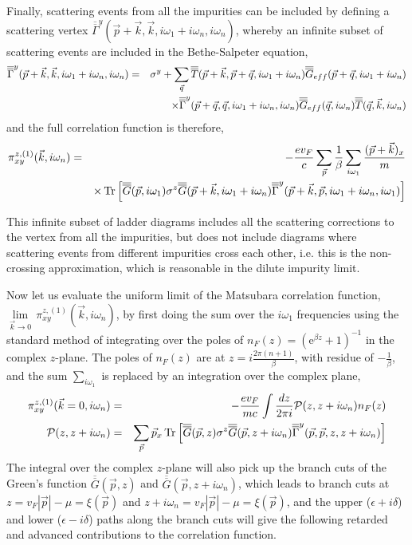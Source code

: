 \documentclass[letter,12pt,preprint,aps]{revtex4-1}
\newcommand{\ba}{\begin{eqnarray}}
\newcommand{\ea}{\end{eqnarray}}
\newcommand{\me}{\mathrm{e}}
\newcommand{\Gbar}{\overline{\overline{G}}}
\newcommand{\Tbar}{\overline{\overline{T}}}
\newcommand{\Gammabar}{\overline{\overline{\Gamma}}}
\begin{document}
Finally, scattering events from all the impurities can be included by defining a scattering vertex $\Gammabar^{y}(\vec{p} + \vec{k}, \vec{k}, i \omega_1 + i \omega_n, i \omega_n)$, whereby an infinite subset of scattering events are included in the Bethe-Salpeter equation,
%
\ba
\label{eqn: vertex Dyson eqn}
\Gammabar^{y}(\vec{p} + \vec{k}, \vec{k}, i \omega_1 + i \omega_n, i \omega_n) & = & \sigma^y + \sum_{\vec{q}} \Tbar(\vec{p} + \vec{k}, \vec{p} + \vec{q}, i \omega_1 + i \omega_n) \Gbar_{eff}(\vec{p}+\vec{q}, i \omega_1 + i \omega_n) \cr
& & \times \Gammabar^{y}(\vec{p} + \vec{q}, \vec{q}, i \omega_1 + i \omega_n, i \omega_n) \Gbar_{eff}(\vec{q}, i \omega_n) \Tbar(\vec{q}, \vec{k}, i \omega_n)
\ea
%
and the full correlation function is therefore,
% 
\ba
\label{eqn: full scattering vertex with Gammabar}
\pi^{z, (1)}_{xy} (\vec{k}, i \omega_n) & = & -\frac{e v_F}{c} \sum_{\vec{p}} \frac{1}{\beta} \sum_{i \omega_1} \frac{(\vec{p} + \vec{k})_x}{m} \cr
 & & \times \Tr \Big[  \Gbar(\vec{p}, i \omega_1) \sigma^z  \Gbar(\vec{p} + \vec{k}, i \omega_1 + i \omega_n) \Gammabar^{y}(\vec{p} + \vec{k}, \vec{p}, i \omega_1 + i \omega_n, i \omega_1) \Big]  
 \ea

This infinite subset of ladder diagrams includes all the scattering corrections to the vertex from all the impurities, but does not include diagrams where scattering events from different impurities cross each other, i.e. this is the non-crossing approximation, which is reasonable in the dilute impurity limit.

Now let us evaluate the uniform limit of the Matsubara correlation function, $\underset{\vec{k} \to 0}{\lim} \, \pi^{z, (1)}_{xy}(\vec{k}, i \omega_n)$, by first doing the sum over the $i  \omega_1$ frequencies using the standard method of integrating over the poles of $n_F(z) = (\me^{\beta z} + 1)^{-1}$ in the complex $z$-plane. The poles of $n_F(z)$ are at $z = i \tfrac{2 \pi (n + 1)}{\beta}$, with residue of $- \tfrac{1}{\beta}$, and the sum $\sum_{i \omega_1}$ is replaced by an integration over the complex plane,
%
\ba
\pi^{z, (1)}_{xy}(\vec{k} = 0, i \omega_n) & = & - \frac{e v_F}{m c} \int \frac{d z}{2 \pi i} \mathcal{P}(z, z + i \omega_n) n_F(z) \cr
\mathcal{P}(z, z + i \omega_n) & =  & \sum_{\vec{p}} \vec{p}_x \Tr \Big[ \Gbar(\vec{p}, z) \sigma^z \Gbar(\vec{p}, z + i \omega_n) \Gammabar^{y}(\vec{p}, \vec{p}, z, z + i \omega_n) \Big]
\ea
%
The integral over the complex $z$-plane will also pick up the branch cuts of the Green's function $\Gbar(\vec{p}, z)$ and $\Gbar(\vec{p}, z + i \omega_n)$, which leads to branch cuts at $z = v_F |\vec{p}| - \mu = \xi(\vec{p})$ and $z + i \omega_n = v_F |\vec{p}| - \mu = \xi(\vec{p})$, and the upper ($\epsilon + i \delta$) and lower ($\epsilon - i \delta$)  paths along the branch cuts will give the following retarded and advanced contributions to the correlation function.
\end{document}
